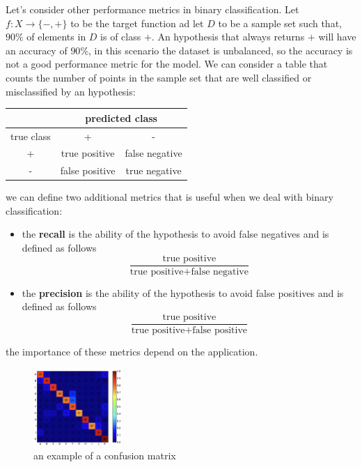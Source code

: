 \documentclass[10pt, letterpaper]{report}
\begin{document}
Let's consider other performance metrics in binary classification. Let $f:X\rightarrow\{-,+\}$ to be the target function ad let $D$ to be a sample set such that, $90\%$ of elements in $D$ is of class $+$. An hypothesis that always returns $+$ will have an accuracy of $90\%$, in this scenario the dataset is unbalanced, so the accuracy is not a good performance metric for the model. We can consider a table that counts the number of points in the sample set that are well classified or misclassified by an hypothesis:\begin{center}
    \begin{tabular}{c|cc|}
\cline{2-3}
                                 & \multicolumn{2}{c|}{predicted class}                 \\ \hline
\multicolumn{1}{|c|}{true class} & \multicolumn{1}{c|}{+}              & -              \\ \hline
\multicolumn{1}{|c|}{+}          & \multicolumn{1}{c|}{true positive}  & false negative \\ \hline
\multicolumn{1}{|c|}{-}          & \multicolumn{1}{c|}{false positive} & true negative  \\ \hline
\end{tabular}
\end{center}
we can define two additional metrics that is useful when we deal with binary classification:\begin{itemize}
    \item the \textbf{recall} is the ability of the hypothesis to avoid false negatives and is defined as follows\begin{equation}
        \frac{\text{true positive}}{\text{true positive}+\text{false negative}}
    \end{equation}
    \item the \textbf{precision} is the ability of the hypothesis to avoid false positives and is defined as follows\begin{equation}
        \frac{\text{true positive}}{\text{true positive}+\text{false positive}}
    \end{equation}
\end{itemize}
the importance of these metrics depend on the application.
\bigskip
\begin{figure}[h!]
    \centering
    \includegraphics[width=0.3\textwidth]{images/conf_matrix.png}
    \caption{an example of a confusion matrix}
    \label{img:conf_matrix}
\end{figure}\bigskip
\end{document}
